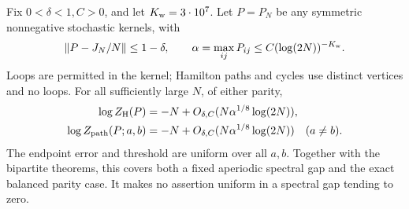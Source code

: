 \begin{theorem}
\label{thm:generalweightedentropy}
Fix \(0<\delta<1,C>0\), and let \(K_{\rm w}=3\cdot10^7\).
Let \(P=P_N\) be any symmetric nonnegative stochastic kernels,
with
\[
 \|P-J_N/N\|\leq1-\delta,\qquad
 \alpha=\max_{ij}P_{ij}\leq C(\log(2N))^{-K_{\rm w}}.
\]
Loops are permitted in the kernel; Hamilton paths and cycles
use distinct vertices and no loops.
For all sufficiently large \(N\), of either parity,
\[
 \begin{split}
 \log Z_{\rm H}(P)
       &=-N+O_{\delta,C}(N\alpha^{1/8}\log(2N)),\\
 \log Z_{\rm path}(P;a,b)
       &=-N+O_{\delta,C}(N\alpha^{1/8}\log(2N))
                         \quad(a\ne b).
 \end{split}
\]
The endpoint error and threshold are uniform over all \(a,b\).
Together with the bipartite theorems, this covers both a fixed
aperiodic spectral gap and the exact balanced parity case.
It makes no assertion uniform in a spectral gap tending to zero.
\end{theorem}
